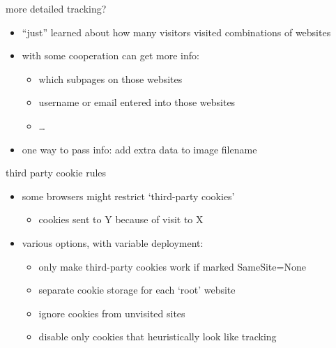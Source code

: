 \begin{frame}{more detailed tracking?}
    \begin{itemize}
    \item ``just'' learned about how many visitors visited combinations of websites
    \item with some cooperation can get more info:
        \begin{itemize}
        \item which subpages on those websites
        \item username or email entered into those websites
        \item \ldots
        \end{itemize}
    \item one way to pass info: add extra data to image filename
    \end{itemize}
\end{frame}

\begin{frame}{third party cookie rules}
    \begin{itemize}
    \item some browsers might restrict `third-party cookies'
        \begin{itemize}
        \item cookies sent to Y because of visit to X
        \end{itemize}
    \item various options, with variable deployment:
        \begin{itemize}
        \item only make third-party cookies work if marked SameSite=None
        \item separate cookie storage for each `root' website
        \item ignore cookies from unvisited sites
        \item disable only cookies that heuristically look like tracking
        \end{itemize}
    \end{itemize}
\end{frame}
